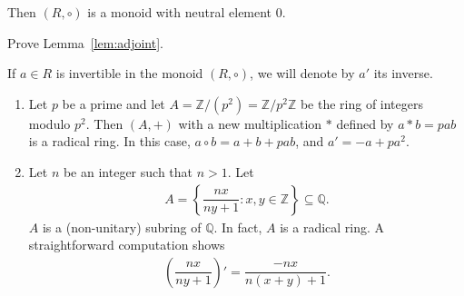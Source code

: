     \begin{lemma}\label{lem:adjoint}
        Then $(R,\circ)$ is a monoid with neutral element $0$. 
    \end{lemma}

    \begin{exercise}
        Prove Lemma~\ref{lem:adjoint}.
    \end{exercise}

    \begin{convention}
        If $a\in R$ is invertible in the monoid $(R, \circ)$, 
        we will denote by $a'$ its inverse.
    \end{convention}

    \begin{examples}\mbox{}
        \begin{enumerate}
            \item Let $p$ be a prime and let $A = \mathbb{Z}/(p^2) = \mathbb{Z}/p^2\mathbb{Z}$ be the ring of integers modulo $p^2$. Then $(A,+)$ with a new multiplication $\ast$ defined by $a\ast b = pab$ is a radical ring. In this case, $a\circ b = a+b+pab$, and $a' =-a+pa^2$. 
            \item Let $n$ be an integer such that $n>1$. Let 
                \begin{align*}
                    A=\left\{\dfrac{nx}{ny+1}\colon x,y \in \mathbb{Z}\right\}\subseteq \mathbb{Q}.
                \end{align*}
                $A$ is a (non-unitary) subring of $\mathbb{Q}$. In fact, $A$ is a radical ring. A straightforward computation shows
                \begin{align*}
                    \left(\dfrac{nx}{ny+1}\right)' = \dfrac{-nx}{n(x+y)+1}.
                \end{align*}
        \end{enumerate}
    \end{examples}